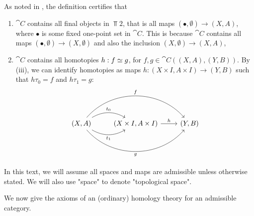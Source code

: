 \begin{remark}
As noted in \cite{Werndli}, the definition certifies that
\begin{enumerate}
    \item $\cat{C}$ contains all final objects in $\Top{2}$, that is all maps $(\bullet,\emptyset)\rightarrow (X,A)$, where $\bullet$ is some fixed one-point set in $\cat{C}$. This is because $\cat{C}$ contains all maps $(\bullet,\emptyset)\rightarrow (X,\emptyset)$ and also the inclusion $(X,\emptyset)\rightarrow (X,A)$,
    \item $\cat{C}$ contains all homotopies $h:f\simeq g$, for $f,g\in \cat{C}((X,A),(Y,B))$. By (iii), we can identify homotopies as maps $h:(X\times I,A\times I)\rightarrow (Y,B)$ such that $h\tau_0=f$ and $h\tau_1=g$:
\[\begin{tikzcd}
{(X,A)} \arrow[r, "t_1"', bend right] \arrow[r, "t_0", bend left] \arrow[rr, "f", bend left=49] \arrow[rr, "g"', bend right=49] & {(X\times I,A\times I)} \arrow[r, "h"] & {(Y,B)}
\end{tikzcd}\]
\end{enumerate}

\end{remark}

In this text, we will assume all spaces and maps are admissible unless otherwise stated. We will also use "space" to denote "topological space". 

We now give the axioms of an (ordinary) homology theory for an admissible category.

